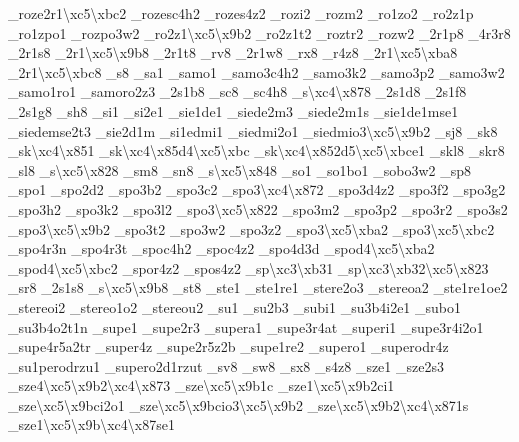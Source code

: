 \begin{DoxyCompactItemize}
\-\_\-roze2r1\textbackslash{}xc5\textbackslash{}xbc2 \-\_\-rozesc4h2 \-\_\-rozes4z2 \-\_\-rozi2 \-\_\-rozm2 \-\_\-ro1zo2 \-\_\-ro2z1p \-\_\-ro1zpo1 \-\_\-rozpo3w2 \-\_\-ro2z1\textbackslash{}xc5\textbackslash{}x9b2 \-\_\-ro2z1t2 \-\_\-roztr2 \-\_\-rozw2 \-\_\-2r1p8 \-\_\-4r3r8 \-\_\-2r1s8 \-\_\-2r1\textbackslash{}xc5\textbackslash{}x9b8 \-\_\-2r1t8 \-\_\-rv8 \-\_\-2r1w8 \-\_\-rx8 \-\_\-r4z8 \-\_\-2r1\textbackslash{}xc5\textbackslash{}xba8 \-\_\-2r1\textbackslash{}xc5\textbackslash{}xbc8 \-\_\-s8 \-\_\-sa1 \-\_\-samo1 \-\_\-samo3c4h2 \-\_\-samo3k2 \-\_\-samo3p2 \-\_\-samo3w2 \-\_\-samo1ro1 \-\_\-samoro2z3 \-\_\-2s1b8 \-\_\-sc8 \-\_\-sc4h8 \-\_\-s\textbackslash{}xc4\textbackslash{}x878 \-\_\-2s1d8 \-\_\-2s1f8 \-\_\-2s1g8 \-\_\-sh8 \-\_\-si1 \-\_\-si2e1 \-\_\-sie1de1 \-\_\-siede2m3 \-\_\-siede2m1s \-\_\-sie1de1mse1 \-\_\-siedemse2t3 \-\_\-sie2d1m \-\_\-si1edmi1 \-\_\-siedmi2o1 \-\_\-siedmio3\textbackslash{}xc5\textbackslash{}x9b2 \-\_\-sj8 \-\_\-sk8 \-\_\-sk\textbackslash{}xc4\textbackslash{}x851 \-\_\-sk\textbackslash{}xc4\textbackslash{}x85d4\textbackslash{}xc5\textbackslash{}xbc \-\_\-sk\textbackslash{}xc4\textbackslash{}x852d5\textbackslash{}xc5\textbackslash{}xbce1 \-\_\-skl8 \-\_\-skr8 \-\_\-sl8 \-\_\-s\textbackslash{}xc5\textbackslash{}x828 \-\_\-sm8 \-\_\-sn8 \-\_\-s\textbackslash{}xc5\textbackslash{}x848 \-\_\-so1 \-\_\-so1bo1 \-\_\-sobo3w2 \-\_\-sp8 \-\_\-spo1 \-\_\-spo2d2 \-\_\-spo3b2 \-\_\-spo3c2 \-\_\-spo3\textbackslash{}xc4\textbackslash{}x872 \-\_\-spo3d4z2 \-\_\-spo3f2 \-\_\-spo3g2 \-\_\-spo3h2 \-\_\-spo3k2 \-\_\-spo3l2 \-\_\-spo3\textbackslash{}xc5\textbackslash{}x822 \-\_\-spo3m2 \-\_\-spo3p2 \-\_\-spo3r2 \-\_\-spo3s2 \-\_\-spo3\textbackslash{}xc5\textbackslash{}x9b2 \-\_\-spo3t2 \-\_\-spo3w2 \-\_\-spo3z2 \-\_\-spo3\textbackslash{}xc5\textbackslash{}xba2 \-\_\-spo3\textbackslash{}xc5\textbackslash{}xbc2 \-\_\-spo4r3n \-\_\-spo4r3t \-\_\-spoc4h2 \-\_\-spoc4z2 \-\_\-spo4d3d \-\_\-spod4\textbackslash{}xc5\textbackslash{}xba2 \-\_\-spod4\textbackslash{}xc5\textbackslash{}xbc2 \-\_\-spor4z2 \-\_\-spos4z2 \-\_\-sp\textbackslash{}xc3\textbackslash{}xb31 \-\_\-sp\textbackslash{}xc3\textbackslash{}xb32\textbackslash{}xc5\textbackslash{}x823 \-\_\-sr8 \-\_\-2s1s8 \-\_\-s\textbackslash{}xc5\textbackslash{}x9b8 \-\_\-st8 \-\_\-ste1 \-\_\-ste1re1 \-\_\-stere2o3 \-\_\-stereoa2 \-\_\-ste1re1oe2 \-\_\-stereoi2 \-\_\-stereo1o2 \-\_\-stereou2 \-\_\-su1 \-\_\-su2b3 \-\_\-subi1 \-\_\-su3b4i2e1 \-\_\-subo1 \-\_\-su3b4o2t1n \-\_\-supe1 \-\_\-supe2r3 \-\_\-supera1 \-\_\-supe3r4at \-\_\-superi1 \-\_\-supe3r4i2o1 \-\_\-supe4r5a2tr \-\_\-super4z \-\_\-supe2r5z2b \-\_\-supe1re2 \-\_\-supero1 \-\_\-superodr4z \-\_\-su1perodrzu1 \-\_\-supero2d1rzut \-\_\-sv8 \-\_\-sw8 \-\_\-sx8 \-\_\-s4z8 \-\_\-sze1 \-\_\-sze2s3 \-\_\-sze4\textbackslash{}xc5\textbackslash{}x9b2\textbackslash{}xc4\textbackslash{}x873 \-\_\-sze\textbackslash{}xc5\textbackslash{}x9b1c \-\_\-sze1\textbackslash{}xc5\textbackslash{}x9b2ci1 \-\_\-sze\textbackslash{}xc5\textbackslash{}x9bci2o1 \-\_\-sze\textbackslash{}xc5\textbackslash{}x9bcio3\textbackslash{}xc5\textbackslash{}x9b2 \-\_\-sze\textbackslash{}xc5\textbackslash{}x9b2\textbackslash{}xc4\textbackslash{}x871s \-\_\-sze1\textbackslash{}xc5\textbackslash{}x9b\textbackslash{}xc4\textbackslash{}x87se1 
\end{DoxyCompactItemize}
